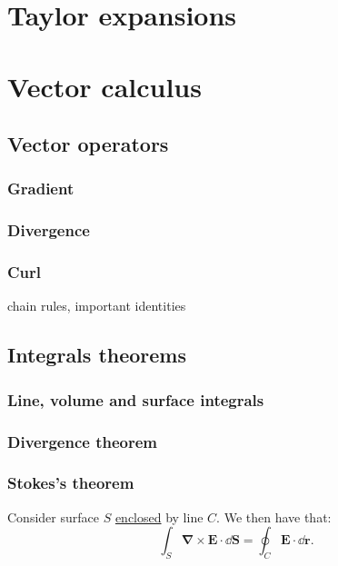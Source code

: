\documentclass{article}
\begin{document}
\section{Taylor expansions}

\newpage

\section{Vector calculus}

\subsection{Vector operators}

\subsubsection{Gradient}

\subsubsection{Divergence}

\subsubsection{Curl}

chain rules, important identities

\subsection{Integrals theorems}

\subsubsection{Line, volume and surface integrals}

\subsubsection{Divergence theorem}

\subsubsection{Stokes's theorem}
Consider surface $S$ \underline{enclosed}
by line $C$. We then have that:
$$\int_S\boldsymbol{\nabla}\times\boldsymbol{E}\cdot
\dd\boldsymbol{S}=
\oint_C\boldsymbol{E}\cdot\dd\boldsymbol{r}.$$
\end{document}
